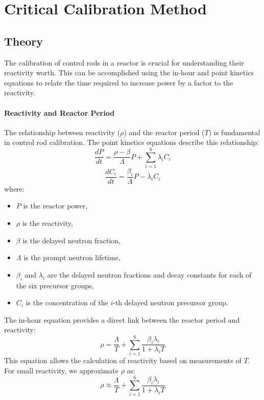 \section{Critical Calibration Method}

\subsection{Theory}
The calibration of control rods in a reactor is crucial for understanding their reactivity worth. This can be accomplished using the in-hour and point kinetics equations to relate the time required to increase power by a factor to the reactivity.

\paragraph{Reactivity and Reactor Period}
The relationship between reactivity ($\rho$) and the reactor period ($T$) is fundamental in control rod calibration. The point kinetics equations describe this relationship:
\begin{equation}
    \frac{dP}{dt} = \frac{\rho - \beta}{\Lambda}P + \sum_{i=1}^6 \lambda_i C_i
\end{equation}
\begin{equation}
    \frac{dC_i}{dt} = \frac{\beta_i}{\Lambda}P - \lambda_i C_i
\end{equation}
where:
\begin{itemize}
    \item $P$ is the reactor power,
    \item $\rho$ is the reactivity,
    \item $\beta$ is the delayed neutron fraction,
    \item $\Lambda$ is the prompt neutron lifetime,
    \item $\beta_i$ and $\lambda_i$ are the delayed neutron fractions and decay constants for each of the six precursor groups,
    \item $C_i$ is the concentration of the $i$-th delayed neutron precursor group.
\end{itemize}

The in-hour equation provides a direct link between the reactor period and reactivity:
\begin{equation}
    \rho = \frac{\Lambda}{T} + \sum_{i=1}^6 \frac{\beta_i \lambda_i}{1 + \lambda_i T}
\end{equation}
This equation allows the calculation of reactivity based on measurements of $T$. For small reactivity, we approximate $\rho$ as:
\begin{equation}
    \rho \approx \frac{\Lambda}{T} + \sum_{i=1}^6 \frac{\beta_i \lambda_i}{1 + \lambda_i T}
\end{equation}

